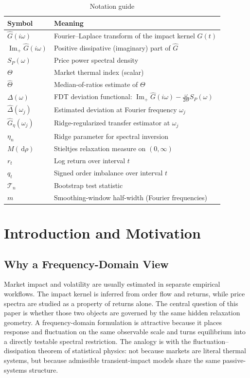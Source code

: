 \documentclass[11pt]{article}
\newcommand{\cT}{\mathcal{T}}
\newcommand{\Ghat}{\widehat{G}}
\newcommand{\ImPart}{\operatorname{Im}_{\!+}}
\newcommand{\dd}{\,\mathrm{d}}
\begin{document}
\begin{table}[t]
\centering
\caption{Notation guide}
\small
\begin{tabular}{>{\raggedright\arraybackslash}p{} >{\raggedright\arraybackslash}p{}}
\toprule
Symbol & Meaning \\
\midrule
$\Ghat(i\omega)$ & Fourier--Laplace transform of the impact kernel $G(t)$ \\
$\ImPart \Ghat(i\omega)$ & Positive dissipative (imaginary) part of $\Ghat$ \\
$S_P(\omega)$ & Price power spectral density \\
$\Theta$ & Market thermal index (scalar) \\
$\widehat\Theta$ & Median-of-ratios estimate of $\Theta$ \\
$\Delta(\omega)$ & FDT deviation functional: $\ImPart\Ghat(i\omega)-\frac{\omega}{2\Theta}S_P(\omega)$ \\
$\widehat\Delta(\omega_j)$ & Estimated deviation at Fourier frequency $\omega_j$ \\
$\widehat G_\eta(\omega_j)$ & Ridge-regularized transfer estimator at $\omega_j$ \\
$\eta_n$ & Ridge parameter for spectral inversion \\
$M(\dd\rho)$ & Stieltjes relaxation measure on $(0,\infty)$ \\
$r_t$ & Log return over interval $t$ \\
$q_t$ & Signed order imbalance over interval $t$ \\
$\cT_n$ & Bootstrap test statistic \\
$m$ & Smoothing-window half-width (Fourier frequencies) \\
\bottomrule
\end{tabular}
\label{tab:notation}
\end{table}

\section{Introduction and Motivation}

\subsection{Why a Frequency-Domain View}
Market impact and volatility are usually estimated in separate empirical workflows. The impact kernel is inferred from order flow and returns, while price spectra are studied as a property of returns alone. The central question of this paper is whether those two objects are governed by the same hidden relaxation geometry. A frequency-domain formulation is attractive because it places response and fluctuation on the same observable scale and turns equilibrium into a directly testable spectral restriction. The analogy is with the fluctuation--dissipation theorem of statistical physics: not because markets are literal thermal systems, but because admissible transient-impact models share the same passive-systems structure.
\end{document}
